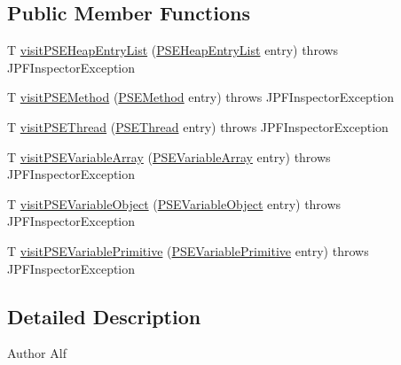 \subsection*{Public Member Functions}
\begin{DoxyCompactItemize}
\item 
T \hyperlink{interfacegov_1_1nasa_1_1jpf_1_1inspector_1_1common_1_1pse_1_1_p_s_e_visitor_a30d924c35c2cdf523f227ee38d5e8be5}{visit\+P\+S\+E\+Heap\+Entry\+List} (\hyperlink{classgov_1_1nasa_1_1jpf_1_1inspector_1_1common_1_1pse_1_1_p_s_e_heap_entry_list}{P\+S\+E\+Heap\+Entry\+List} entry)  throws J\+P\+F\+Inspector\+Exception
\item 
T \hyperlink{interfacegov_1_1nasa_1_1jpf_1_1inspector_1_1common_1_1pse_1_1_p_s_e_visitor_a2496aaab0de700199c77baba72c544cd}{visit\+P\+S\+E\+Method} (\hyperlink{classgov_1_1nasa_1_1jpf_1_1inspector_1_1common_1_1pse_1_1_p_s_e_method}{P\+S\+E\+Method} entry)  throws J\+P\+F\+Inspector\+Exception
\item 
T \hyperlink{interfacegov_1_1nasa_1_1jpf_1_1inspector_1_1common_1_1pse_1_1_p_s_e_visitor_a3dd0085376292e23871b6f754e9ab0eb}{visit\+P\+S\+E\+Thread} (\hyperlink{classgov_1_1nasa_1_1jpf_1_1inspector_1_1common_1_1pse_1_1_p_s_e_thread}{P\+S\+E\+Thread} entry)  throws J\+P\+F\+Inspector\+Exception
\item 
T \hyperlink{interfacegov_1_1nasa_1_1jpf_1_1inspector_1_1common_1_1pse_1_1_p_s_e_visitor_a694361fcc25436e3a5ef775ca05e1b32}{visit\+P\+S\+E\+Variable\+Array} (\hyperlink{classgov_1_1nasa_1_1jpf_1_1inspector_1_1common_1_1pse_1_1_p_s_e_variable_array}{P\+S\+E\+Variable\+Array} entry)  throws J\+P\+F\+Inspector\+Exception
\item 
T \hyperlink{interfacegov_1_1nasa_1_1jpf_1_1inspector_1_1common_1_1pse_1_1_p_s_e_visitor_a3dcad4d6a2264705e43726b934dcc610}{visit\+P\+S\+E\+Variable\+Object} (\hyperlink{classgov_1_1nasa_1_1jpf_1_1inspector_1_1common_1_1pse_1_1_p_s_e_variable_object}{P\+S\+E\+Variable\+Object} entry)  throws J\+P\+F\+Inspector\+Exception
\item 
T \hyperlink{interfacegov_1_1nasa_1_1jpf_1_1inspector_1_1common_1_1pse_1_1_p_s_e_visitor_a8ca998a9c9ea31dd1b31f45db5b77d45}{visit\+P\+S\+E\+Variable\+Primitive} (\hyperlink{classgov_1_1nasa_1_1jpf_1_1inspector_1_1common_1_1pse_1_1_p_s_e_variable_primitive}{P\+S\+E\+Variable\+Primitive} entry)  throws J\+P\+F\+Inspector\+Exception
\end{DoxyCompactItemize}


\subsection{Detailed Description}
\begin{DoxyAuthor}{Author}
Alf 
\end{DoxyAuthor}


